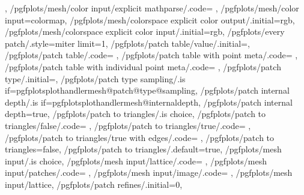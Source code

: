{{		%
		\pgfplots@perpointmeta@expandtrue
	},%
	/pgfplots/mesh/color input/explicit mathparse/.code={%
		\def\pgfplotsplothandlermesh@colorinput@mathparse{1}%
		\pgfplots@perpointmeta@expandtrue
	},%
	/pgfplots/mesh/color input=colormap,
	/pgfplots/mesh/colorspace explicit color output/.initial=rgb,
	/pgfplots/mesh/colorspace explicit color input/.initial=rgb,
	/pgfplots/every patch/.style={miter limit=1},
	/pgfplots/patch table/value/.initial=,
	/pgfplots/patch table/.code={
		\pgfplotsplothandlermesh@patchtable@hascdatafalse
	},
	/pgfplots/patch table with point meta/.code={%
		\pgfplotsplothandlermesh@patchtable@hascdatatrue
		\pgfplotsplothandlermesh@patchtable@cdata@individualfalse
	},
	/pgfplots/patch table with individual point meta/.code={%
		\pgfplotsplothandlermesh@patchtable@hascdatatrue
		\pgfplotsplothandlermesh@patchtable@cdata@individualtrue
	},
	/pgfplots/patch type/.initial=,
	/pgfplots/patch type sampling/.is if=pgfplotsplothandlermesh@patch@type@sampling,
	/pgfplots/patch internal depth/.is if=pgfplotsplothandlermesh@internaldepth,
	/pgfplots/patch internal depth=true,
	/pgfplots/patch to triangles/.is choice,
	/pgfplots/patch to triangles/false/.code=			{\def\pgfplotsplothandlermesh@triangulate{0}},
	/pgfplots/patch to triangles/true/.code=			{\def\pgfplotsplothandlermesh@triangulate{1}},
	/pgfplots/patch to triangles/true with edges/.code=	{\def\pgfplotsplothandlermesh@triangulate{2}},
	/pgfplots/patch to triangles=false,
	/pgfplots/patch to triangles/.default=true,
	/pgfplots/mesh input/.is choice,
	/pgfplots/mesh input/lattice/.code=	{\def\pgfplotsplothandlermesh@matrixinput{1}},
	/pgfplots/mesh input/patches/.code=	{\def\pgfplotsplothandlermesh@matrixinput{0}},
	/pgfplots/mesh input/image/.code=	{\def\pgfplotsplothandlermesh@matrixinput{2}},
	/pgfplots/mesh input/lattice,
	/pgfplots/patch refines/.initial=0,
}
